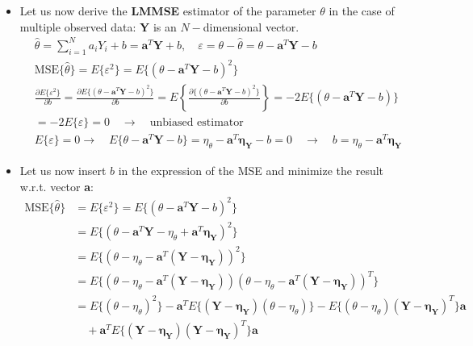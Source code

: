 \begin{itemize}
    \item Let us now derive the \textbf{LMMSE} estimator of the parameter \(\theta\) in the case of multiple observed data: \textbf{Y} is an \(N-\)dimensional vector.
    \begin{align*}
&\hat{\theta} = \sum_{i=1}^{N} a_{i}Y_{i} + b = \mathbf{a}^{T}\mathbf{Y} + b, \quad \varepsilon = \theta - \hat{\theta} = \theta - \mathbf{a}^{T}\mathbf{Y} - b \\[8pt]
&\text{MSE}\{\hat{\theta}\} = E\{\varepsilon^2\} = E\{(\theta - \mathbf{a}^{T}\mathbf{Y} - b)^2\} \\[8pt]
&\frac{\partial E\{\varepsilon^2\}}{\partial b} = \frac{\partial E\{(\theta - \mathbf{a}^{T}\mathbf{Y} - b)^2\}}{\partial b} = E\left\{\frac{\partial\{(\theta - \mathbf{a}^{T}\mathbf{Y} - b)^2\}}{\partial b}\right\} = -2E\{(\theta - \mathbf{a}^{T}\mathbf{Y} - b)\} \\[8pt]
&= -2E\{\varepsilon\} = 0 \quad \rightarrow \quad \text{unbiased estimator} \\[8pt]
&E\{\varepsilon\}=0 \rightarrow \quad E\{\theta - \mathbf{a}^{T}\mathbf{Y} - b\} = \eta_{\theta} - \mathbf{a}^{T}\boldsymbol{\eta}_{\mathbf{Y}} - b = 0 \quad \rightarrow \quad b = \eta_{\theta} - \mathbf{a}^{T}\boldsymbol{\eta}_{\mathbf{Y}}
\end{align*}
\item Let us now insert \(b\) in the expression of the MSE and minimize the result w.r.t. vector \textbf{a}:
\begin{align*}
\text{MSE}\{\hat{\theta}\} &= E\{\varepsilon^2\} = E\{(\theta - \mathbf{a}^{T}\mathbf{Y} - b)^2\} \\[8pt]
&= E\{(\theta - \mathbf{a}^{T}\mathbf{Y} - \eta_{\theta} + \mathbf{a}^{T}\boldsymbol{\eta}_{\mathbf{Y}})^2\} \\[8pt]
&= E\{(\theta - \eta_{\theta} - \mathbf{a}^{T}(\mathbf{Y} - \boldsymbol{\eta}_{\mathbf{Y}}))^2\} \\[8pt]
&= E\{(\theta - \eta_{\theta} - \mathbf{a}^{T}(\mathbf{Y} - \boldsymbol{\eta}_{\mathbf{Y}}))(\theta - \eta_{\theta} - \mathbf{a}^{T}(\mathbf{Y} - \boldsymbol{\eta}_{\mathbf{Y}}))^T\} \\[8pt]
&= E\{(\theta - \eta_{\theta})^2\} - \mathbf{a}^{T}E\{(\mathbf{Y} - \boldsymbol{\eta}_{\mathbf{Y}})(\theta - \eta_{\theta})\} - E\{(\theta - \eta_{\theta})(\mathbf{Y} - \boldsymbol{\eta}_{\mathbf{Y}})^{T}\}\mathbf{a} \\[8pt]
&\quad +\mathbf{a}^{T}E\{(\mathbf{Y} - \boldsymbol{\eta}_{\mathbf{Y}})(\mathbf{Y} - \boldsymbol{\eta}_{\mathbf{Y}})^{T}\}\mathbf{a} \\[8pt]

\end{align*}
\end{itemize}
